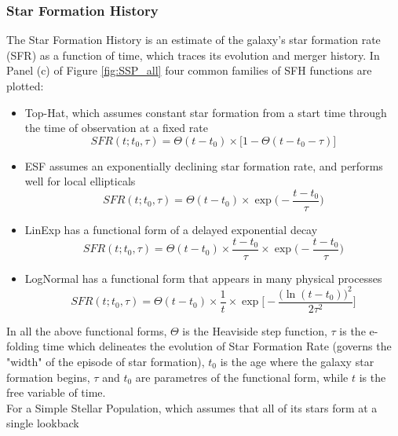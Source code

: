 \subsubsection*{Star Formation History}
The Star Formation History is an estimate of the galaxy’s star formation rate (SFR) as a function of time, which traces its evolution and merger history\cite{Leja2013}. In Panel (c) of Figure \ref{fig:SSP_all} four common families of SFH functions are plotted:
\begin{itemize}
    \item Top-Hat, which assumes constant star formation from a start time through the time of observation at a fixed rate
    \begin{equation}
        SFR(t; t_0, \tau) = \Theta(t-t_0)\times  \Big[1- \Theta(t-t_0-\tau) \Big] \label{eq:SFHtophat}
    \end{equation}
    \item ESF assumes an exponentially declining star formation rate, and performs well for local ellipticals
    \begin{equation}
        SFR(t; t_0, \tau) = \Theta(t-t_0) \times \exp{\Big(- \dfrac{t-t_0}{\tau} \Big) }
        \label{eq:SFHesf}
    \end{equation}
    \item LinExp has a functional form of a delayed exponential decay
    \begin{equation}
        SFR(t; t_0, \tau) = \Theta(t-t_0) \times \dfrac{t-t_0}{\tau} \times\exp{\Big(- \dfrac{t-t_0}{\tau} \Big)} 
        \label{eq:SFHlinexp}
    \end{equation}
    \item LogNormal has a functional form that appears in many physical processes
    \begin{equation}
        SFR(t; t_0, \tau) = \Theta(t-t_0) \times \dfrac{1}{t} \times\exp{\big[- \dfrac{\Big(\ln(t-t_0)\big)^2}{2\tau^2} \Big]} 
        \label{eq:SFHlognorm}
    \end{equation}
\end{itemize}
In all the above functional forms, $\Theta$ is the Heaviside step function, $\tau$ is the e-folding time which delineates the evolution of Star Formation Rate (governs the "width" of the episode of star formation), $t_0$ is the age where the galaxy star formation begins, $\tau$ and $t_0$ are parametres of the functional form, while $t$ is the free variable of time.\\
For a Simple Stellar Population, which assumes that all of its stars form at a single lookback
